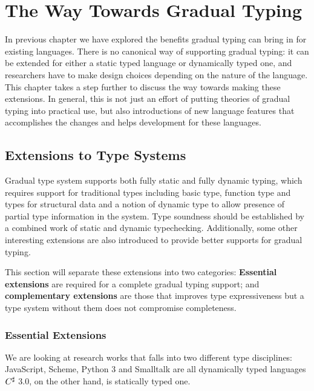 
\renewcommand{\thechapter}{3}

\chapter{The Way Towards Gradual Typing}


In previous chapter we have explored the benefits gradual typing
can bring in for existing languages.
There is no canonical way of supporting gradual typing:
it can be extended for either a static typed language or dynamically typed one,
and researchers have to make design choices depending on the nature of the language.
This chapter takes a step further to discuss the way towards making these extensions.
In general, this is not just an effort of putting theories of gradual typing into practical use,
but also introductions of new language features that accomplishes the changes
and helps development for these languages.

\section{Extensions to Type Systems}

Gradual type system supports both fully static and fully dynamic typing,
which requires support for traditional types including
basic type, function type and types for structural data
and a notion of dynamic type to allow presence of partial type information in the system.
Type soundness should be established by a combined work of static and dynamic typechecking.
Additionally, some other interesting extensions are also introduced to provide better
supports for gradual typing.

This section will separate these extensions into two categories:
\textbf{Essential extensions} are required for a complete gradual typing support;
and \textbf{complementary extensions} are those that improves type expressiveness
but a type system without them does not compromise completeness.

\subsection{Essential Extensions}

We are looking at research works that falls into two different type disciplines:
JavaScript, Scheme, Python 3 and Smalltalk are all dynamically typed languages
$C^\sharp$ 3.0, on the other hand, is statically typed one.


